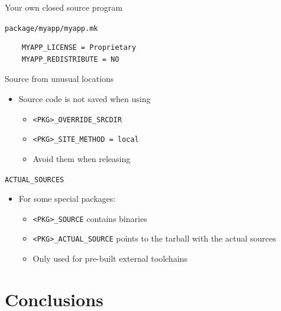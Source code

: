 \documentclass[xetex,table,table]{beamer}
\begin{document}
\begin{frame}[fragile]{Your own closed source program}

  {\tt package/myapp/myapp.mk}
  \begin{verbatim}
    MYAPP_LICENSE = Proprietary
    MYAPP_REDISTRIBUTE = NO
  \end{verbatim}
\end{frame}

\begin{frame}{Source from unusual locations}
  \begin{itemize}
  \item Source code is not saved when using
    \begin{itemize}
    \item {\tt <PKG>\_OVERRIDE\_SRCDIR}
    \item {\tt <PKG>\_SITE\_METHOD = local}
    \item[\textrightarrow] Avoid them when releasing
    \end{itemize}
  \end{itemize}
\end{frame}

\begin{frame}{\tt ACTUAL\_SOURCES}
  \begin{itemize}
  \item For some special packages:
    \begin{itemize}
    \item {\tt <PKG>\_SOURCE} contains binaries
    \item {\tt <PKG>\_ACTUAL\_SOURCE} points to the tarball with the actual sources
    \item Only used for pre-built external toolchains
    \end{itemize}
  \end{itemize}
\end{frame}


\section{Conclusions}
\end{document}
